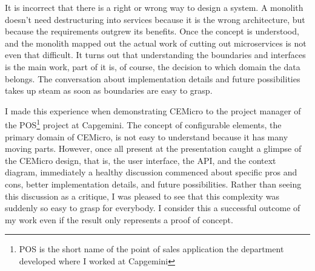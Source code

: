 It is incorrect that there is a right or wrong way to design a system. A monolith doesn't need destructuring into services because it is the wrong architecture, but because the requirements outgrew its benefits. Once the concept is understood, and the monolith mapped out the actual work of cutting out microservices is not even that difficult. It turns out that understanding the boundaries and interfaces is the main work, part of it is, of course, the decision to which domain the data belongs. The conversation about implementation details and future possibilities takes up steam as soon as boundaries are easy to grasp.

I made this experience when demonstrating CEMicro to the project manager of the POS\footnote{POS is the short name of the point of sales application the department developed where I worked at Capgemini} project at Capgemini. The concept of configurable elements, the primary domain of CEMicro, is not easy to understand because it has many moving parts. However, once all present at the presentation caught a glimpse of the CEMicro design, that is, the user interface, the API, and the context diagram, immediately a healthy discussion commenced about specific pros and cons, better implementation details, and future possibilities. Rather than seeing this discussion as a critique, I was pleased to see that this complexity was suddenly so easy to grasp for everybody. I consider this a successful outcome of my work even if the result only represents a proof of concept.



